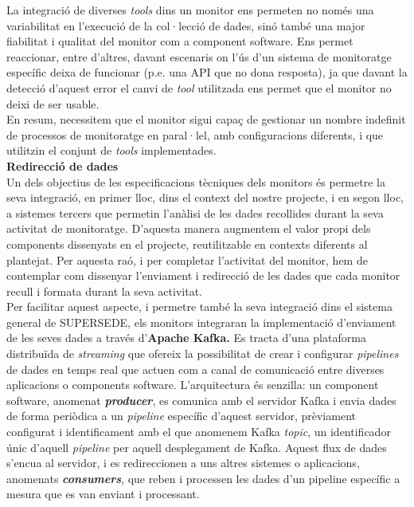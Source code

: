 La integració de diverses \textit{tools} dins un monitor ens permeten no només una variabilitat en l'execució de la col·lecció de dades, sinó també una major fiabilitat i qualitat del monitor com a component software. Ens permet reaccionar, entre d'altres, davant escenaris on l'ús d'un sistema de monitoratge específic deixa de funcionar (p.e. una API que no dona resposta), ja que davant la detecció d'aquest error el canvi de \textit{tool} utilitzada ens permet que el monitor no deixi de ser usable.\\

En resum, necessitem que el monitor sigui capaç de gestionar un nombre indefinit de processos de monitoratge en paral·lel, amb configuracions diferents, i que utilitzin el conjunt de \textit{tools} implementades.\\

\noindent \textbf{\large Redirecció de dades}\\

\noindent Un dels objectius de les especificacions tècniques dels monitors és permetre la seva integració, en primer lloc, dins el context del nostre projecte, i en segon lloc, a sistemes tercers que permetin l'anàlisi de les dades recollides durant la seva activitat de monitoratge. D'aquesta manera augmentem el valor propi dels components dissenyats en el projecte, reutilitzable en contexts diferents al plantejat. Per aquesta raó, i per completar l'activitat del monitor, hem de contemplar com dissenyar l'enviament i redirecció de les dades que cada monitor recull i formata durant la seva activitat. \\

Per facilitar aquest aspecte, i permetre també la seva integració dins el sistema general de SUPERSEDE, els monitors integraran la implementació d'enviament de les seves dades a través d'\textbf{Apache Kafka.} Es tracta d'una plataforma distribuïda de \textit{streaming} que ofereix la possibilitat de crear i configurar \textit{pipelines} de dades en temps real que actuen com a canal de comunicació entre diverses aplicacions o components software. L'arquitectura és senzilla: un component software, anomenat \textbf{\textit{producer}}, es comunica amb el servidor Kafka i envia dades de forma periòdica a un \textit{pipeline} específic d'aquest servidor, prèviament configurat i identificament amb el que anomenem Kafka \textit{topic}, un identificador únic d'aquell \textit{pipeline} per aquell desplegament de Kafka. Aquest flux de dades s'encua al servidor, i es redireccionen a uns altres sistemes o aplicacions, anomenats \textbf{\textit{consumers}}, que reben i processen les dades d'un pipeline específic a mesura que es van enviant i processant.\\


